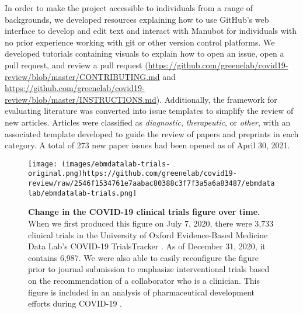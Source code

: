 \documentclass[twocolumn]{ceurart}
\begin{document}
In order to make the project accessible to individuals from a range of backgrounds, we developed resources explaining how to use GitHub's web interface to develop and edit text and interact with Manubot for individuals with no prior experience working with git or other version control platforms.
We developed tutorials containing visuals to explain how to open an issue, open a pull request, and review a pull request (\url{https://github.com/greenelab/covid19-review/blob/master/CONTRIBUTING.md} and \url{https://github.com/greenelab/covid19-review/blob/master/INSTRUCTIONS.md}).
Additionally, the framework for evaluating literature was converted into issue templates to simplify the review of new articles.
Articles were classified as \emph{diagnostic}, \emph{therapeutic}, or \emph{other}, with an associated template developed to guide the review of papers and preprints in each category.
A total of 273 new paper issues had been opened as of April 30, 2021.

\begin{figure}
\hypertarget{fig:ebm-trials}{%
\centering
\texttt{[image: (images/ebmdatalab-trials-original.png)https://github.com/greenelab/covid19-review/raw/2546f1534761e7aabac80388c3f7f3a5a6a83487/ebmdatalab/ebmdatalab-trials.png]}
\caption{\textbf{Change in the COVID-19 clinical trials figure over time.}
When we first produced this figure on July 7, 2020, there were 3,733 clinical trials in the University of Oxford Evidence-Based Medicine Data Lab's COVID-19 TrialsTracker \citep{SSbnPnzT}.
As of December 31, 2020, it contains 6,987.
We were also able to easily reconfigure the figure prior to journal submission to emphasize interventional trials based on the recommendation of a collaborator who is a clinician.
This figure is included in an analysis of pharmaceutical development efforts during COVID-19 \citep{cifK9B8t}.}\label{fig:ebm-trials}
}
\end{figure}
\end{document}
